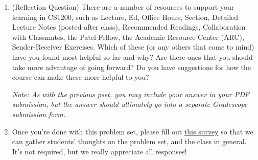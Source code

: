\documentclass[11pt]{article}
\begin{document}
\begin{enumerate}
\begin{enumerate}
        \end{enumerate}

\item (Reflection Question)  There are a number of resources to support your learning in CS1200, such as Lecture, Ed, Office Hours, Section, Detailed Lecture Notes (posted after class), Recommended Readings, Collaboration with Classmates, the Patel Fellow, the Academic Resource Center (ARC), Sender-Receiver Exercises.  Which of these (or any others that come to mind) have you found most helpful so far and why?  Are there ones that you should take more advantage of going forward?  Do you have suggestions for how the course can make these more helpful to you?

\textit{Note: As with the previous pset, you may include your answer in your PDF submission, but the answer should ultimately go into a separate Gradescope submission form.}

\item Once you're done with this problem set, please fill out \href{https://forms.gle/Skby2L5TszNpSYDB6}{this survey} so that we can gather students' thoughts on the problem set, and the class in general. It's not required, but we really appreciate all responses!
\end{enumerate}
\end{document}
